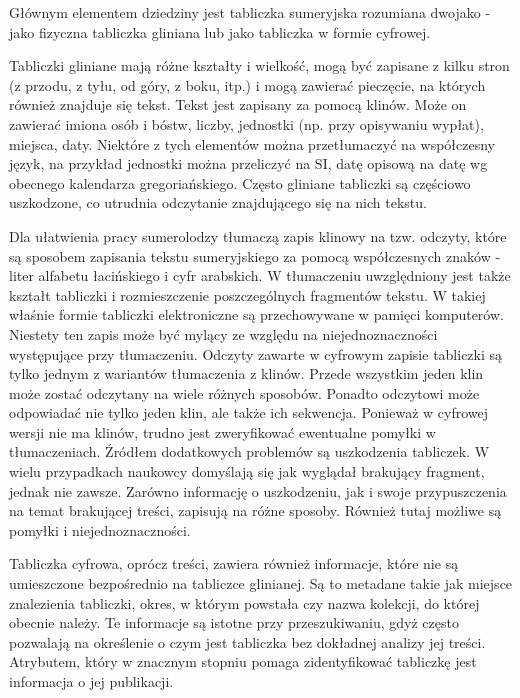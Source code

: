 Głównym elementem dziedziny jest tabliczka sumeryjska rozumiana dwojako - jako fizyczna tabliczka gliniana lub jako tabliczka w formie cyfrowej.

Tabliczki gliniane mają różne kształty i wielkość, mogą być zapisane z kilku stron (z przodu, z tyłu, od góry, z boku, itp.) i mogą zawierać pieczęcie, na których również znajduje się tekst. Tekst jest zapisany za pomocą klinów.
Może on zawierać imiona osób i bóstw, liczby, jednostki (np. przy opisywaniu wypłat), miejsca, daty. Niektóre z tych elementów można przetłumaczyć na współczesny język, na przykład jednostki można przeliczyć na SI, datę opisową na datę wg obecnego kalendarza gregoriańskiego. Często gliniane tabliczki są częściowo uszkodzone, co utrudnia odczytanie znajdującego się na nich tekstu.

Dla ułatwienia pracy sumerolodzy tłumaczą zapis klinowy na tzw. odczyty, które są sposobem zapisania tekstu sumeryjskiego za pomocą współczesnych znaków - liter alfabetu łacińskiego i cyfr arabskich. W tłumaczeniu uwzględniony jest także kształt tabliczki i rozmieszczenie poszczególnych fragmentów tekstu. W takiej właśnie formie tabliczki elektroniczne są przechowywane w pamięci komputerów. Niestety ten zapis może być mylący ze względu na niejednoznaczności występujące przy tłumaczeniu. Odczyty zawarte w cyfrowym zapisie tabliczki są tylko jednym z wariantów tłumaczenia z klinów. Przede wszystkim jeden klin może zostać odczytany na wiele różnych sposobów. Ponadto odczytowi może odpowiadać nie tylko jeden klin, ale także ich sekwencja. Ponieważ w cyfrowej wersji nie ma klinów, trudno jest zweryfikować ewentualne pomyłki w tłumaczeniach. 
Źródłem dodatkowych problemów są uszkodzenia tabliczek. W wielu przypadkach naukowcy domyślają się jak wyglądał brakujący fragment, jednak nie zawsze. Zarówno informację o uszkodzeniu, jak i swoje przypuszczenia na temat brakującej treści, zapisują na różne sposoby. Również tutaj możliwe są pomyłki i niejednoznaczności.

Tabliczka cyfrowa, oprócz treści, zawiera również informacje, które nie są umieszczone bezpośrednio na tabliczce glinianej. Są to metadane takie jak miejsce znalezienia tabliczki, okres, w którym powstała czy nazwa kolekcji, do której obecnie należy. Te informacje są istotne przy przeszukiwaniu, gdyż często pozwalają na określenie o czym jest tabliczka bez dokładnej analizy jej treści. Atrybutem, który w znacznym stopniu pomaga zidentyfikować tabliczkę jest informacja o jej publikacji.


